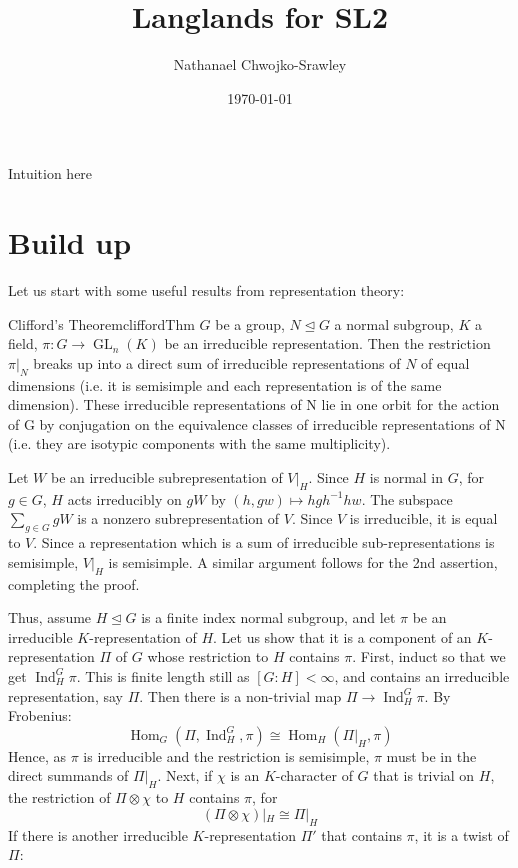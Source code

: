 \documentclass{article}
\title{Langlands for SL2}
\author{Nathanael Chwojko-Srawley}
\date{\today}
\renewcommand{\maketitle}{
    \quad
    \vspace{1em}
  \begin{center}
      \LARGE\bfseries \thetitle \par
      \vspace{0.6em}
      \large
  \end{center}
    \vspace{1em}
}
\newcommand{\GL}{{\operatorname{GL}}}
\newcommand{\Hom}{{\operatorname{Hom}}}
\newcommand{\Ind}{{\operatorname{Ind}}}
\newcommand{\nsubg}{\trianglelefteq}
\begin{document}
\maketitle

Intuition here

\section{Build up}


Let us start with some useful results from representation theory:

\begin{thm}{Clifford's Theorem}{cliffordThm}
	$G$ be a group, $N\nsubg G$ a normal subgroup, $K$ a field, $\pi: G \to \GL_n(K)$ be an irreducible
	representation. Then the restriction $\pi|_N$ breaks up into a direct sum of irreducible representations
	of $N$ of equal dimensions (i.e. it is semisimple and each representation is of the same dimension). These
	irreducible representations of N lie in one orbit for the action of G by conjugation on the equivalence
	classes of irreducible representations of N (i.e. they are isotypic components with the same multiplicity).
\end{thm}

\begin{Proof}
	Let $W$ be an irreducible subrepresentation of $V|_H$. Since $H$ is normal in $G$, for $g \in G$, $H$ acts
	irreducibly on $gW$ by $(h, gw) \mapsto hgh^{-1}hw$. The subspace $\sum_{g \in G} gW$ is a nonzero
	subrepresentation of $V$. Since $V$ is irreducible, it is equal to $V$. Since a representation which is a sum
	of irreducible sub-representations is semisimple, $V|_H$ is semisimple. A similar argument follows for the 2nd
	assertion, completing the proof.
\end{Proof}

Thus, assume $H\nsubg G$ is a finite index normal subgroup, and let $\pi$ be an irreducible $K$-representation
of $H$. Let us show that it is a component of an $K$-representation $\Pi$ of $G$ whose restriction to $H$
contains $\pi$. First, induct so that we get $\Ind_H^G\pi$. This is finite length still as $[G:H] < \infty$,
and contains an irreducible representation, say $\Pi$. Then there is a non-trivial map $\Pi \to \Ind_H^G
\pi$. By Frobenius:
\[
  \Hom_G(\Pi, \Ind_H^G, \pi) \cong \Hom_H(\Pi|_H, \pi)
\]
Hence, as $\pi$ is irreducible and the restriction is semisimple, $\pi$ must be in the direct summands of
$\Pi|_H$. Next, if $\chi$ is an $K$-character of $G$ that is trivial on $H$, the restriction of $\Pi\otimes
\chi$ to $H$ contains $\pi$, for
\[
  (\Pi \otimes \chi)|_H \cong \Pi|_H
\]
If there is another irreducible $K$-representation $\Pi'$ that contains $\pi$, it is a twist of $\Pi$:
\end{document}
